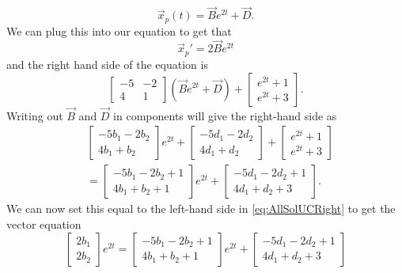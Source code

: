 \begin{exampleSol}
\begin{enumerate}[1.]
\begin{equation*}
\vec{x}_p(t) = \vec{B}e^{2t} + \vec{D}.
\end{equation*}
We can plug this into our equation to get that 
\begin{equation}\label{eq:AllSolUCRight}
\vec{x}_p' = 2\vec{B}e^{2t}
\end{equation}
and the right hand side of the equation is 
\begin{equation*}
\begin{bmatrix} -5 & -2 \\ 4 & 1 \end{bmatrix}\left(\vec{B}e^{2t} + \vec{D}\right) + \begin{bmatrix} e^{2t} + 1 \\ e^{2t} + 3 \end{bmatrix}.
\end{equation*}
Writing out $\vec{B}$ and $\vec{D}$ in components will give the right-hand side as
\begin{equation*}
\begin{split}
& \begin{bmatrix} -5b_1 - 2b_2 \\ 4b_1 + b_2 \end{bmatrix}e^{2t} + \begin{bmatrix} -5d_1 - 2d_2 \\ 4d_1 + d_2 \end{bmatrix} + \begin{bmatrix} e^{2t} + 1 \\ e^{2t} + 3 \end{bmatrix} \\
&= \begin{bmatrix} -5b_1 - 2b_2 + 1 \\ 4b_1 + b_2 + 1 \end{bmatrix}e^{2t} + \begin{bmatrix} -5d_1 - 2d_2 + 1\\ 4d_1 + d_2 + 3 \end{bmatrix}.
\end{split}
\end{equation*}
We can now set this equal to the left-hand side in \eqref{eq:AllSolUCRight} to get the vector equation
\begin{equation*}
\begin{bmatrix} 2b_1 \\ 2b_2 \end{bmatrix} e^{2t} = \begin{bmatrix} -5b_1 - 2b_2 + 1 \\ 4b_1 + b_2 + 1 \end{bmatrix}e^{2t} + \begin{bmatrix} -5d_1 - 2d_2 + 1\\ 4d_1 + d_2 + 3 \end{bmatrix}

\end{equation*}
\end{enumerate}
\end{exampleSol}
